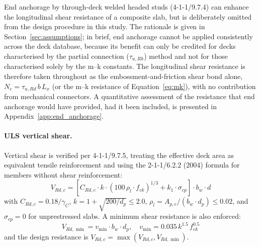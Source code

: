 End anchorage by through-deck welded headed studs (4-1-1/9.7.4) can enhance the longitudinal shear resistance of a composite slab, but is deliberately omitted from the design procedure in this study. The rationale is given in Section~\ref{sec:assumptions}; in brief, end anchorage cannot be applied consistently across the deck database, because its benefit can only be credited for decks characterised by the partial connection ($\tau_{u,Rk}$) method and not for those characterised solely by the m--k constants. The longitudinal shear resistance is therefore taken throughout as the embossment-and-friction shear bond alone, $N_c = \tau_{u,Rd}\,b\,L_x$ (or the m--k resistance of Equation~\eqref{eq:mk}), with no contribution from mechanical connectors. A quantitative assessment of the resistance that end anchorage would have provided, had it been included, is presented in Appendix~\ref{app:end_anchorage}.

\paragraph{ULS vertical shear.} Vertical shear is verified per 4-1-1/9.7.5, treating the effective deck area as equivalent tensile reinforcement and using the 2-1-1/6.2.2 (2004) formula for members without shear reinforcement:
\begin{equation}
    V_{Rd,c} = \left[ C_{Rd,c} \cdot k \cdot (100\,\rho_l \cdot f_{ck})^{1/3} + k_1 \cdot \sigma_{cp} \right] \cdot b_w \cdot d
    \label{eq:vrd_c}
\end{equation}
with $C_{Rd,c} = 0.18/\gamma_C$, $k = 1 + \sqrt{200/d_p} \le 2.0$, $\rho_l = A_{p,e}/(b_w \cdot d_p) \le 0.02$, and $\sigma_{cp} = 0$ for unprestressed slabs. A minimum shear resistance is also enforced:
\begin{equation}
    V_{Rd,\min} = v_\mathrm{min} \cdot b_w \cdot d_p, \quad v_\mathrm{min} = 0.035\,k^{1.5}\,f_{ck}^{0.5}
    \label{eq:vrd_min}
\end{equation}
and the design resistance is $V_{Rd,c} = \max(V_{Rd,c},V_{Rd,\min})$.


